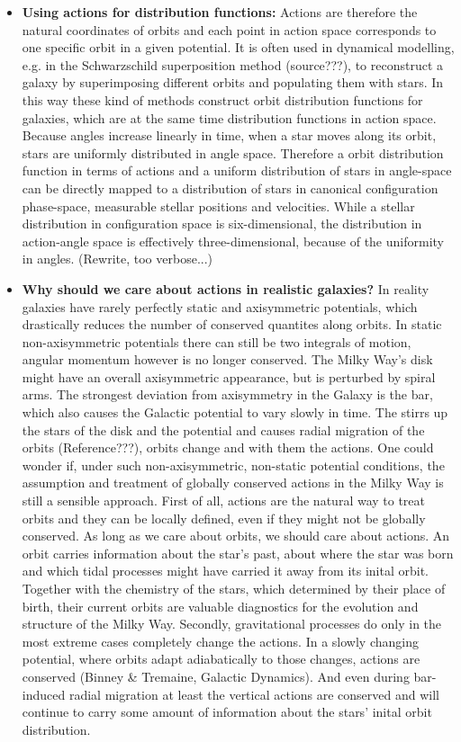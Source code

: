 \documentclass[12pt,preprint]{aastex}
\begin{document}
\begin{itemize}
\item \textbf{Using actions for distribution functions:} Actions are therefore the natural coordinates of orbits and each point in action space corresponds to one specific orbit in a given potential. It is often used in dynamical modelling, e.g. in the Schwarzschild superposition method (source???), to reconstruct a galaxy by superimposing different orbits and populating them with stars. In this way these kind of methods construct orbit distribution functions for galaxies, which are at the same time distribution functions in action space. Because angles increase linearly in time, when a star moves along its orbit, stars are uniformly distributed in angle space. Therefore a orbit distribution function in terms of actions and a uniform distribution of stars in angle-space can be directly mapped to a distribution of stars in canonical configuration phase-space, measurable stellar positions and velocities. While a stellar distribution in configuration space is six-dimensional, the distribution in action-angle space is effectively three-dimensional, because of the uniformity in angles. (Rewrite, too verbose...)

\item \textbf{Why should we care about actions in realistic galaxies?} In reality galaxies have rarely perfectly static and axisymmetric potentials, which drastically reduces the number of conserved quantites along orbits. In static non-axisymmetric  potentials there can still be two integrals of motion, angular momentum however is no longer conserved. The Milky Way's disk might have an overall axisymmetric appearance, but is perturbed by spiral arms. The strongest deviation from axisymmetry in the Galaxy is the bar, which also causes the Galactic potential to vary slowly in time. The stirrs up the stars of the disk and the potential and causes radial migration of the orbits (Reference???), orbits change and with them the actions. One could wonder if, under such non-axisymmetric, non-static potential conditions, the assumption and treatment of globally conserved actions in the Milky Way is still a sensible approach. First of all, actions are the natural way to treat orbits and they can be locally defined, even if they might not be globally conserved. As long as we care about orbits, we should care about actions. An orbit carries information about the star's past, about where the star was born and which tidal processes might have carried it away from its inital orbit. Together with the chemistry of the stars, which determined by their place of birth, their current orbits are valuable diagnostics for the evolution and structure of the Milky Way. Secondly, gravitational processes do only in the most extreme cases completely change the actions. In a slowly changing potential, where orbits adapt adiabatically to those changes, actions are conserved (Binney \& Tremaine, Galactic Dynamics). And even during bar-induced radial migration at least the vertical actions are conserved and will continue to carry some amount of information about the stars' inital orbit distribution.\\


\end{itemize}
\end{document}
